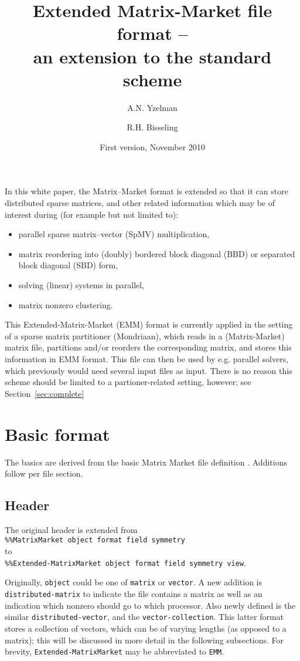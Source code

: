 \documentclass[final]{amsart}
\title{Extended Matrix-Market file format --\\
an extension to the standard scheme}
\author{A.N. Yzelman \and R.H. Bisseling}
\date{First version, November 2010}
\begin{document}
\maketitle

\tableofcontents

In this white paper, the Matrix--Market format is extended so that it can store distributed sparse matrices,
and other related information which may be of interest during 
(for example but not limited to):
\begin{itemize}
\item parallel sparse matrix--vector (SpMV) multiplication,
\item matrix reordering into (doubly) bordered block diagonal (BBD) or separated block diagonal (SBD) form,
\item solving (linear) systems in parallel,
\item matrix nonzero clustering.
\end{itemize}

This Extended-Matrix-Market (EMM) format is currently applied
in the setting of a sparse matrix partitioner (Mondriaan),
which reads in a (Matrix-Market) matrix file,
partitions and/or reorders the corresponding matrix,
and stores this information in EMM format.
This file can then be used by e.g. parallel solvers,
which previously would need several input files as input.
There is no reason this scheme should be limited to a partioner-related setting,
however; see Section~\ref{sec:complete}

\section{Basic format}

The basics are derived from the basic Matrix Market file definition \cite{boisvert1,boisvert2}.
Additions follow per file section.

\subsection{Header}

The original header is extended from\\
\verb|%%MatrixMarket object format field symmetry|\\
to\\
\verb|%%Extended-MatrixMarket object format field symmetry view|.

Originally, \verb|object| could be one of \verb|matrix| or \verb|vector|.
A new addition is \verb|distributed-matrix| to indicate the file contains a matrix as well as an indication which nonzero should go to which processor.
Also newly defined is the similar \verb|distributed-vector|, and the \verb|vector-collection|.
This latter format stores a collection of vectors, which can be of varying lengths (as opposed to a matrix);
this will be discussed in more detail in the following subsections.
For brevity, \verb|Extended-MatrixMarket| may be abbreviated to \verb|EMM|.
\end{document}

